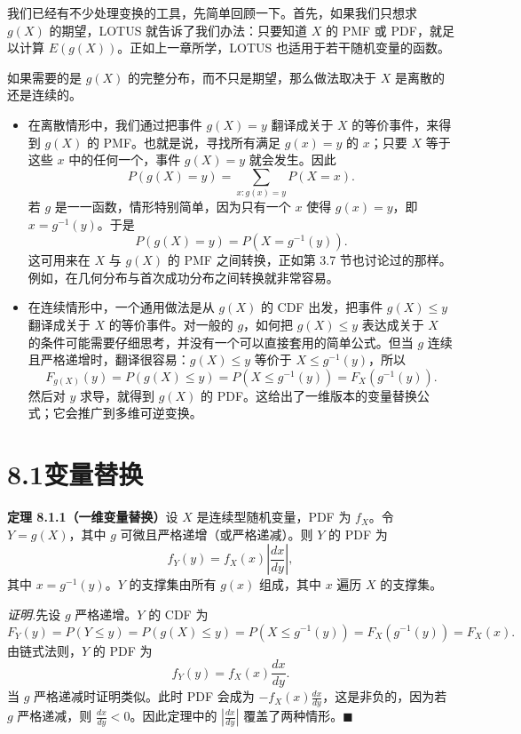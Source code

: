 \documentclass[UTF8, 12pt, fontset=fandol, oneside]{ctexart}
\begin{document}
我们已经有不少处理变换的工具，先简单回顾一下。首先，如果我们只想求 $g(X)$ 的期望，LOTUS 就告诉了我们办法：只要知道 $X$ 的 PMF 或 PDF，就足以计算 $E(g(X))$。正如上一章所学，LOTUS 也适用于若干随机变量的函数。

如果需要的是 $g(X)$ 的完整分布，而不只是期望，那么做法取决于 $X$ 是离散的还是连续的。

\begin{itemize}
  \item 在离散情形中，我们通过把事件 $g(X)=y$ 翻译成关于 $X$ 的等价事件，来得到 $g(X)$ 的 PMF。也就是说，寻找所有满足 $g(x)=y$ 的 $x$；只要 $X$ 等于这些 $x$ 中的任何一个，事件 $g(X)=y$ 就会发生。因此
  \[
    P(g(X)=y)=\sum_{x:g(x)=y}P(X=x).
  \]
  若 $g$ 是一一函数，情形特别简单，因为只有一个 $x$ 使得 $g(x)=y$，即 $x=g^{-1}(y)$。于是
  \[
    P(g(X)=y)=P(X=g^{-1}(y)).
  \]
  这可用来在 $X$ 与 $g(X)$ 的 PMF 之间转换，正如第 3.7 节也讨论过的那样。例如，在几何分布与首次成功分布之间转换就非常容易。

  \item 在连续情形中，一个通用做法是从 $g(X)$ 的 CDF 出发，把事件 $g(X)\le y$ 翻译成关于 $X$ 的等价事件。对一般的 $g$，如何把 $g(X)\le y$ 表达成关于 $X$ 的条件可能需要仔细思考，并没有一个可以直接套用的简单公式。但当 $g$ 连续且严格递增时，翻译很容易：$g(X)\le y$ 等价于 $X\le g^{-1}(y)$，所以
  \[
    F_{g(X)}(y)=P(g(X)\le y)=P(X\le g^{-1}(y))=F_X(g^{-1}(y)).
  \]
  然后对 $y$ 求导，就得到 $g(X)$ 的 PDF。这给出了一维版本的变量替换公式；它会推广到多维可逆变换。
\end{itemize}

\section*{8.1\quad 变量替换}

\noindent\textbf{定理 8.1.1（一维变量替换）}\quad 设 $X$ 是连续型随机变量，PDF 为 $f_X$。令 $Y=g(X)$，其中 $g$ 可微且严格递增（或严格递减）。则 $Y$ 的 PDF 为
\[
  f_Y(y)=f_X(x)\left|\frac{dx}{dy}\right|,
\]
其中 $x=g^{-1}(y)$。$Y$ 的支撑集由所有 $g(x)$ 组成，其中 $x$ 遍历 $X$ 的支撑集。

\noindent\textit{证明.}\quad 先设 $g$ 严格递增。$Y$ 的 CDF 为
\[
  F_Y(y)=P(Y\le y)=P(g(X)\le y)=P(X\le g^{-1}(y))
  =F_X(g^{-1}(y))=F_X(x).
\]
由链式法则，$Y$ 的 PDF 为
\[
  f_Y(y)=f_X(x)\frac{dx}{dy}.
\]
当 $g$ 严格递减时证明类似。此时 PDF 会成为 $-f_X(x)\frac{dx}{dy}$，这是非负的，因为若 $g$ 严格递减，则 $\frac{dx}{dy}<0$。因此定理中的 $\left|\frac{dx}{dy}\right|$ 覆盖了两种情形。$\blacksquare$
\end{document}
